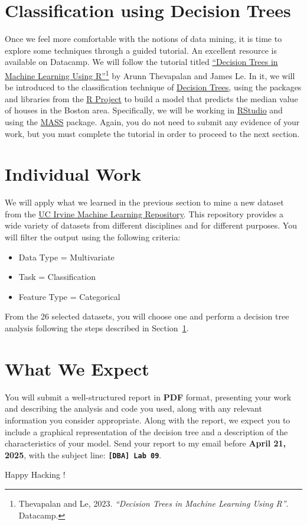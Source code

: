 \documentclass{article}
\begin{document}
\section{Classification using Decision Trees}\label{sec:tree}
Once we feel more comfortable with the notions of data mining, it is time to explore some techniques through a guided tutorial. An excellent resource is available on Datacamp. We will follow the tutorial titled \href{https://www.datacamp.com/tutorial/decision-trees-R}{``Decision Trees in Machine Learning Using R''}\footnote{Thevapalan and Le, 2023. \textit{``Decision Trees in Machine Learning Using R''}. Datacamp.} by Arunn Thevapalan and James Le. In it, we will be introduced to the classification technique of \href{https://en.wikipedia.org/wiki/Decision_tree}{Decision Trees}, using the packages and libraries from the \href{https://www.r-project.org/}{R Project} to build a model that predicts the median value of houses in the Boston area. Specifically, we will be working in \href{https://posit.co/download/rstudio-desktop/}{RStudio} and using the \href{https://cran.r-project.org/web/packages/MASS/index.html}{MASS} package. Again, you do not need to submit any evidence of your work, but you must complete the tutorial in order to proceed to the next section.

\section{Individual Work}
We will apply what we learned in the previous section to mine a new dataset from the \href{https://archive.ics.uci.edu/datasets}{UC Irvine Machine Learning Repository}. This repository provides a wide variety of datasets from different disciplines and for different purposes. You will filter the output using the following criteria:

\begin{itemize}
    \item Data Type = Multivariate
    \item Task = Classification
    \item Feature Type = Categorical
\end{itemize}

From the 26 selected datasets, you will choose one and perform a decision tree analysis following the steps described in Section~\ref{sec:tree}.

\section{What We Expect}
You will submit a well-structured report in \textbf{PDF} format, presenting your work and describing the analysis and code you used, along with any relevant information you consider appropriate. Along with the report, we expect you to include a graphical representation of the decision tree and a description of the characteristics of your model. Send your report to my email before \textbf{April 21, 2025}, with the subject line: {\LARGE \textbf{\texttt{[DBA] Lab 09}}}.

\vspace{5mm}
Happy Hacking !
\end{document}
